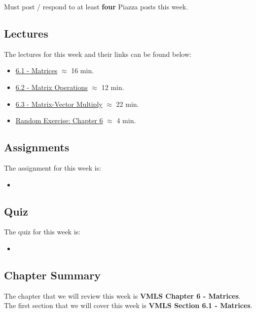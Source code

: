 Must post / respond to at least \textbf{four} Piazza posts this week.

\subsection{Lectures}

The lectures for this week and their links can be found below:

\begin{itemize}
    \item \href{https://applied.cs.colorado.edu/mod/hvp/view.php?id=50733}{6.1 - Matrices} $\approx$ 16 min.
    \item \href{https://applied.cs.colorado.edu/mod/hvp/view.php?id=50734}{6.2 - Matrix Operations} $\approx$ 12 min.
    \item \href{https://applied.cs.colorado.edu/mod/hvp/view.php?id=50735}{6.3 - Matrix-Vector Multiply} $\approx$ 22 min.
    \item \href{https://applied.cs.colorado.edu/mod/hvp/view.php?id=50736}{Random Exercise: Chapter 6} $\approx$ 4 min.
\end{itemize}

\subsection{Assignments}

The assignment for this week is:

\begin{itemize}
    \item {}
\end{itemize}

\subsection{Quiz}

The quiz for this week is:

\begin{itemize}
    \item {}
\end{itemize}

\subsection{Chapter Summary}

The chapter that we will review this week is \textbf{VMLS Chapter 6 - Matrices}. The first section that we will cover this week is \textbf{VMLS Section 6.1 - Matrices}.

